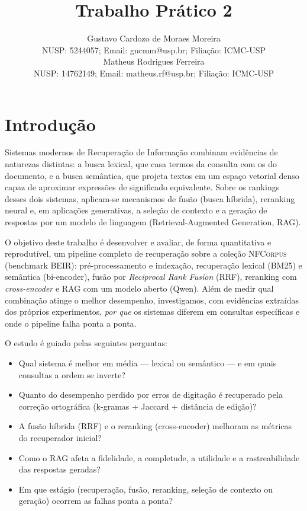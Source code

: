 \documentclass[9pt,a4paper,twocolumn]{article}
\title{\vspace{-1.2cm}\textbf{Trabalho Prático 2}\vspace{-0.2cm}}
\author{
Gustavo Cardozo de Moraes Moreira \\
NUSP: 5244057; Email: gucmm@usp.br; Filiação: ICMC-USP\\
Matheus Rodrigues Ferreira\\
NUSP: 14762149; Email: matheus.rf@usp.br; Filiação: ICMC-USP
}
\newcommand{\bmk}{\textsc{BM25}}
\newcommand{\rrf}{\textsc{RRF}}
\begin{document}
\maketitle
\vspace{-0.6cm}

\section{Introdução}
Sistemas modernos de Recuperação de Informação combinam evidências de naturezas distintas: a
busca lexical, que casa termos da consulta com os do documento, e a busca semântica, que projeta
textos em um espaço vetorial denso capaz de aproximar expressões de significado equivalente.
Sobre os rankings desses dois sistemas, aplicam-se mecanismos de fusão (busca híbrida),
reranking neural e, em aplicações generativas, a seleção de contexto e a geração de respostas
por um modelo de linguagem (Retrieval-Augmented Generation, RAG).

O objetivo deste trabalho é desenvolver e avaliar, de forma quantitativa e reprodutível, um
pipeline completo de recuperação sobre a coleção \textsc{NFCorpus} (benchmark BEIR):
pré-processamento e indexação, recuperação lexical (\bmk{}) e semântica (bi-encoder), fusão por
\textit{Reciprocal Rank Fusion} (\rrf{}), reranking com \textit{cross-encoder} e RAG com um
modelo aberto (Qwen). Além de medir qual combinação atinge o melhor desempenho, investigamos,
com evidências extraídas dos próprios experimentos, \emph{por que} os sistemas diferem em
consultas específicas e onde o pipeline falha ponta a ponta.

O estudo é guiado pelas seguintes perguntas:
\begin{itemize}
  \item Qual sistema é melhor em média --- lexical ou semântico --- e em quais consultas a ordem se inverte?
  \item Quanto do desempenho perdido por erros de digitação é recuperado pela correção ortográfica (k-gramas + Jaccard + distância de edição)?
  \item A fusão híbrida (\rrf{}) e o reranking (cross-encoder) melhoram as métricas do recuperador inicial?
  \item Como o RAG afeta a fidelidade, a completude, a utilidade e a rastreabilidade das respostas geradas?
  \item Em que estágio (recuperação, fusão, reranking, seleção de contexto ou geração) ocorrem as falhas ponta a ponta?
\end{itemize}
\end{document}
